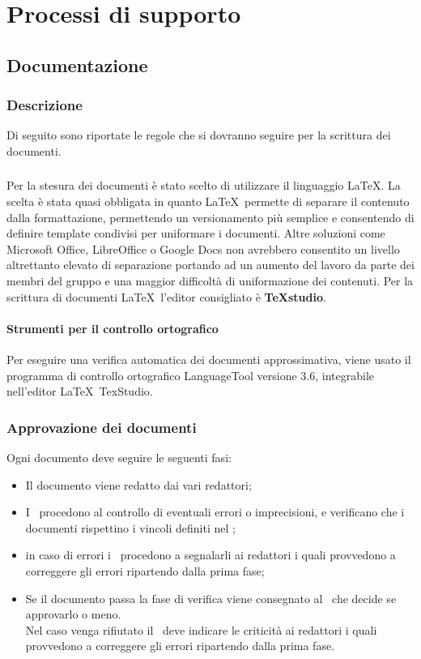 \documentclass[../NormeDiProgetto.tex]{subfiles}
\begin{document}
	\section{Processi di supporto}
		\subsection{Documentazione}
			\subsubsection{Descrizione}
				Di seguito sono riportate le regole che si dovranno seguire per la scrittura dei documenti.
				\subsubsection{\gl{\LaTeX}}
					Per la stesura dei documenti è stato scelto di utilizzare il linguaggio \LaTeX.
					La scelta è stata quasi obbligata in quanto \LaTeX\ permette di separare il contenuto dalla
					formattazione, permettendo un versionamento più semplice e consentendo di definire template
					condivisi per uniformare i documenti. Altre soluzioni come Microsoft Office, LibreOffice o
					Google Docs non avrebbero consentito un livello altrettanto elevato di separazione portando
					ad un aumento del lavoro da parte dei membri del gruppo e una maggior difficoltà di
					uniformazione dei contenuti.
					Per la scrittura di documenti \LaTeX\ l'editor consigliato è \textbf{TeXstudio}.
				\paragraph{Strumenti per il controllo ortografico\\}
					Per eseguire una verifica automatica dei documenti approssimativa,
					viene usato il programma di controllo ortografico LanguageTool versione 3.6, integrabile
					nell'editor \LaTeX\ TexStudio.
			\subsubsection{Approvazione dei documenti}
				Ogni documento deve seguire le seguenti fasi:
				\begin{itemize}
					\item Il documento viene redatto dai vari redattori;
					\item I \verificatori\ procedono al controllo di eventuali errori o
					imprecisioni, e verificano che i documenti rispettino i vincoli definiti nel \pianodiqualificav;
					\item in caso di errori i \verificatori\ procedono a segnalarli ai redattori
					i quali provvedono a correggere gli errori ripartendo dalla prima fase;
					\item Se il documento passa la fase di verifica viene consegnato al
					\responsabilediprogetto\ che decide se approvarlo o meno.\\
					Nel caso venga rifiutato il \responsabilediprogetto\ deve indicare le
					criticità ai redattori i quali provvedono a correggere gli errori
					ripartendo dalla prima fase.
				\end{itemize}
\end{document}
